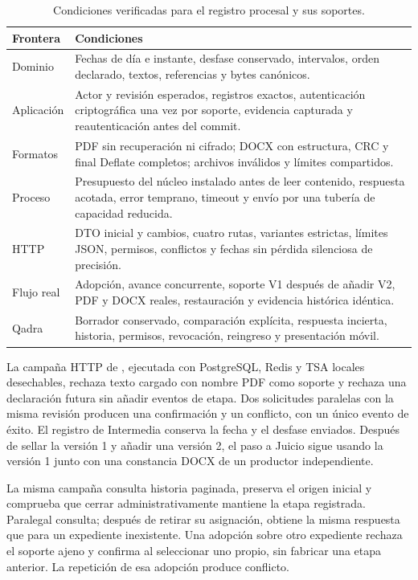 \begin{table}[H]
  \centering
  \caption{Condiciones verificadas para el registro procesal y sus soportes.}
  \label{tab:pruebas-etapas}
  \begin{tabularx}{\linewidth}{@{}L{3.4cm} X@{}}
    \toprule
    \textbf{Frontera} & \textbf{Condiciones} \\
    \midrule
    Dominio & Fechas de día e instante, desfase conservado, intervalos, orden declarado, textos, referencias y bytes canónicos. \\
    Aplicación & Actor y revisión esperados, registros exactos, autenticación criptográfica una vez por soporte, evidencia capturada y reautenticación antes del commit. \\
    Formatos & PDF sin recuperación ni cifrado; DOCX con estructura, CRC y final Deflate completos; archivos inválidos y límites compartidos. \\
    Proceso & Presupuesto del núcleo instalado antes de leer contenido, respuesta acotada, error temprano, timeout y envío por una tubería de capacidad reducida. \\
    HTTP & DTO inicial y cambios, cuatro rutas, variantes estrictas, límites JSON, permisos, conflictos y fechas sin pérdida silenciosa de precisión. \\
    Flujo real & Adopción, avance concurrente, soporte V1 después de añadir V2, PDF y DOCX reales, restauración y evidencia histórica idéntica. \\
    Qadra & Borrador conservado, comparación explícita, respuesta incierta, historia, permisos, revocación, reingreso y presentación móvil. \\
    \bottomrule
  \end{tabularx}
\end{table}

{\raggedright La campaña HTTP de , ejecutada con PostgreSQL, Redis y TSA locales desechables, rechaza texto cargado con nombre PDF como soporte y rechaza una declaración futura sin añadir eventos de etapa. Dos solicitudes paralelas con la misma revisión producen una confirmación y un conflicto, con un único evento de éxito. El registro de Intermedia conserva la fecha y el desfase enviados. Después de sellar la versión 1 y añadir una versión 2, el paso a Juicio sigue usando la versión 1 junto con una constancia DOCX de un productor independiente.\par}

La misma campaña consulta historia paginada, preserva el origen inicial y comprueba que cerrar administrativamente mantiene la etapa registrada. Paralegal consulta; después de retirar su asignación, obtiene la misma respuesta que para un expediente inexistente. Una adopción sobre otro expediente rechaza el soporte ajeno y confirma al seleccionar uno propio, sin fabricar una etapa anterior. La repetición de esa adopción produce conflicto.

